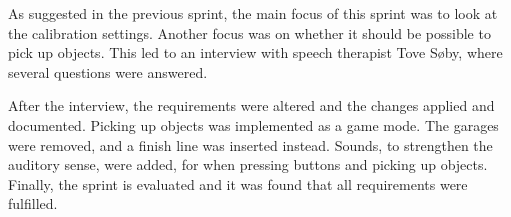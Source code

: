 As suggested in the previous sprint, the main focus of this sprint was to look at the calibration settings.
Another focus was on whether it should be possible to pick up objects.
This led to an interview with speech therapist Tove Søby, where several questions were answered.

After the interview, the requirements were altered and the changes applied and documented.
Picking up objects was implemented as a game mode.
The garages were removed, and a finish line was inserted instead.
Sounds, to strengthen the auditory sense, were added, for when pressing buttons and picking up objects.
Finally, the sprint is evaluated and it was found that all requirements were fulfilled.